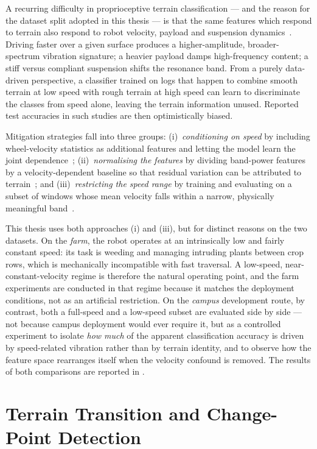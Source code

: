 A recurring difficulty in proprioceptive terrain classification --- and the reason for the dataset split adopted in this thesis --- is that the same features which respond to terrain also respond to robot velocity, payload and suspension dynamics~\cite{Bermudez2012,Coyle2008,Komma2009}. Driving faster over a given surface produces a higher-amplitude, broader-spectrum vibration signature; a heavier payload damps high-frequency content; a stiff versus compliant suspension shifts the resonance band. From a purely data-driven perspective, a classifier trained on logs that happen to combine smooth terrain at low speed with rough terrain at high speed can learn to discriminate the classes from speed alone, leaving the terrain information unused. Reported test accuracies in such studies are then optimistically biased.

Mitigation strategies fall into three groups: (i)~\emph{conditioning on speed} by including wheel-velocity statistics as additional features and letting the model learn the joint dependence~\cite{Ojeda2006}; (ii)~\emph{normalising the features} by dividing band-power features by a velocity-dependent baseline so that residual variation can be attributed to terrain~\cite{Komma2009}; and (iii)~\emph{restricting the speed range} by training and evaluating on a subset of windows whose mean velocity falls within a narrow, physically meaningful band~\cite{Bermudez2012}.

This thesis uses both approaches (i) and (iii), but for distinct reasons on the two datasets. On the \emph{farm}, the robot operates at an intrinsically low and fairly constant speed: its task is weeding and managing intruding plants between crop rows, which is mechanically incompatible with fast traversal. A low-speed, near-constant-velocity regime is therefore the natural operating point, and the farm experiments are conducted in that regime because it matches the deployment conditions, not as an artificial restriction. On the \emph{campus} development route, by contrast, both a full-speed and a low-speed subset are evaluated side by side --- not because campus deployment would ever require it, but as a controlled experiment to isolate \emph{how much} of the apparent classification accuracy is driven by speed-related vibration rather than by terrain identity, and to observe how the feature space rearranges itself when the velocity confound is removed. The results of both comparisons are reported in .

\section{Terrain Transition and Change-Point Detection}
\label{sec:bg-transition}

